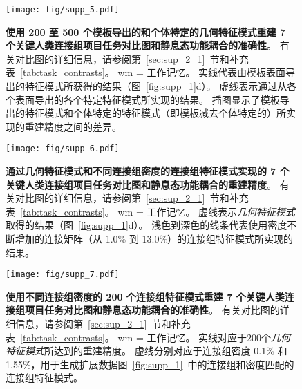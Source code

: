 \documentclass[lang=cn,a4paper,newtx,citestyle=gb7714-2015, bibstyle=gb7714-2015]{elegantpaper}
\begin{document}
\begin{figure}[!htb] 
	\centering
	\texttt{[image: fig/supp\_5.pdf]}
	\caption{\textbf{使用 200 至 500 个模板导出的和个体特定的几何特征模式重建 7 个关键人类连接组项目任务对比图和静息态功能耦合的准确性}。
	有关对比图的详细信息，请参阅第~\ref{sec:sup_2_1}~节和补充表~\ref{tab:task_contrasts}。
	wm = 工作记忆。
	实线代表由模板表面导出的特征模式所获得的结果（图~\ref{fig:supp_1}d）。
	虚线表示通过从各个表面导出的各个特定特征模式所实现的结果。
	插图显示了模板导出的特征模式和个体特定的特征模式（即模板减去个体特定的）所实现的重建精度之间的差异。} \label{fig:supp_5}
\end{figure}



\begin{figure}[!htb] 
	\centering
	\texttt{[image: fig/supp\_6.pdf]}
	\caption{
		\textbf{通过几何特征模式和不同连接组密度的连接组特征模式实现的 7 个关键人类连接组项目任务对比图和静息态功能耦合的重建精度}。
		有关对比图的详细信息，请参阅第~\ref{sec:sup_2_1}~节和补充表~\ref{tab:task_contrasts}。
		wm = 工作记忆。
		虚线表示\textit{几何特征模式}取得的结果（图~\ref{fig:supp_1}d）。
		浅色到深色的线条代表使用密度不断增加的连接矩阵（从 1.0\% 到 13.0\%）的连接组特征模式所实现的结果。
	} \label{fig:supp_6}
\end{figure}


\begin{figure}[!htb] 
	\centering
	\texttt{[image: fig/supp\_7.pdf]}
	\caption{
		\textbf{使用不同连接组密度的 200 个连接组特征模式重建 7 个关键人类连接组项目任务对比图和静息态功能耦合的准确性}。
		有关对比图的详细信息，请参阅第~\ref{sec:sup_2_1}~节和补充表~\ref{tab:task_contrasts}。
		wm = 工作记忆。
		实线对应于200个\textit{几何特征模式}所达到的重建精度。
		虚线分别对应于连接组密度 0.1\% 和 1.55\%，用于生成扩展数据图~\ref{fig:supp_1}~中的连接组和密度匹配的连接组特征模式。
	} \label{fig:supp_7}
\end{figure}
\end{document}
